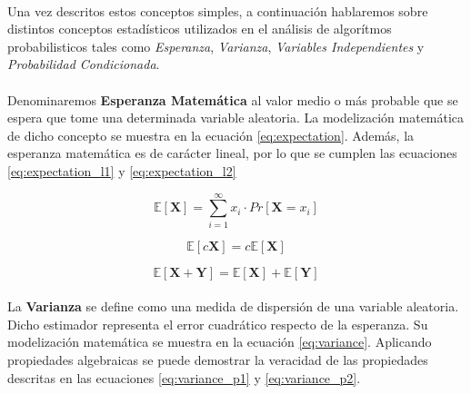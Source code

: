 \documentclass{subfiles}
\begin{document}
        \paragraph{}
        Una vez descritos estos conceptos simples, a continuación hablaremos sobre distintos conceptos estadísticos utilizados en el análisis de algorítmos probabilisticos tales como \emph{Esperanza}, \emph{Varianza}, \emph{Variables Independientes} y \emph{Probabilidad Condicionada}.

        \paragraph{}
        Denominaremos \textbf{Esperanza Matemática} al valor medio o más probable que se espera que tome una determinada variable aleatoria. La modelización matemática de dicho concepto se muestra en la ecuación \eqref{eq:expectation}. Además, la esperanza matemática es de carácter lineal, por lo que se cumplen las ecuaciones \eqref{eq:expectation_l1} y \eqref{eq:expectation_l2}

        \begin{equation}
        \label{eq:expectation}
          \mathbb{E}[\boldsymbol{X}] = \sum_{i=1}^\infty x_i \cdot Pr[\boldsymbol{X} = x_i]
        \end{equation}

        \begin{equation}
        \label{eq:expectation_l1}
          \mathbb{E}[c \boldsymbol{X}] = c \mathbb{E}[\boldsymbol{X}]
        \end{equation}

        \begin{equation}
        \label{eq:expectation_l2}
          \mathbb{E}[\boldsymbol{X} + \boldsymbol{Y}] = \mathbb{E}[\boldsymbol{X}] + \mathbb{E}[\boldsymbol{Y}]
        \end{equation}

        \paragraph{}
        La \textbf{Varianza} se define como una medida de dispersión de una variable aleatoria. Dicho estimador representa el error cuadrático respecto de la esperanza. Su modelización matemática se muestra en la ecuación \eqref{eq:variance}. Aplicando propiedades algebraicas se puede demostrar la veracidad de las propiedades descritas en las ecuaciones \eqref{eq:variance_p1} y \eqref{eq:variance_p2}.
\end{document}
